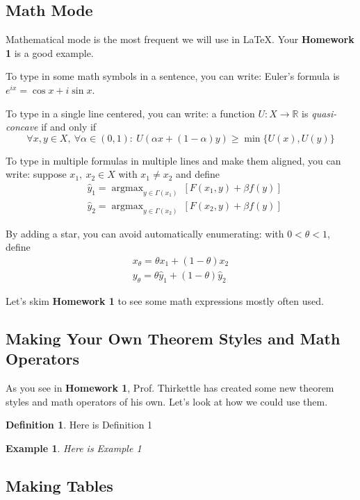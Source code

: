 \documentclass[10pt]{extarticle}
\theoremstyle{theorem}
\theoremstyle{lemma}
\theoremstyle{proposition}
\theoremstyle{corollary}
\theoremstyle{assumption}
\theoremstyle{model}
\theoremstyle{property}
\theoremstyle{example}
\newtheorem{ex}{Example}
\theoremstyle{algorithm}
\theoremstyle{definition}
\newtheorem{defn}{Definition}
\theoremstyle{axiom}
\theoremstyle{remark}
\begin{document}
\subsection{Math Mode}
Mathematical mode is the most frequent we will use in \LaTeX. Your \textbf{Homework 1} is a good example.

To type in some math symbols in a sentence, you can write: Euler's formula is $e^{ix}=\cos x+i \sin x$.

To type in a single line centered, you can write: a function $U:X\to \mathbb{R}$ is \textit{quasi-concave} if and only if
\[
\forall x,y \in X,~\forall \alpha \in (0,1):~U(\alpha x+(1-\alpha)y) \geq \min\{U(x),U(y)\}
\]

To type in multiple formulas in multiple lines and make them aligned, you can write: suppose $x_1,~x_2 \in X$ with $x_1 \neq x_2$ and define
\begin{align}
& \hat{y}_1=\mathop{\arg\max}_{y \in \Gamma(x_1)}~[F(x_1,y)+\beta f(y)] \\
& \hat{y}_2=\mathop{\arg\max}_{y \in \Gamma(x_2)}~[F(x_2,y)+\beta f(y)] 
\end{align}

By adding a star, you can avoid automatically enumerating: with $0<\theta<1$, define
\begin{align*}
x_\theta=\theta x_1+(1-\theta) x_2 \\
y_\theta=\theta \hat{y}_1+(1-\theta) \hat{y}_2
\end{align*}

Let's skim \textbf{Homework 1} to see some math expressions mostly often used. 

\subsection{Making Your Own Theorem Styles and Math Operators}
As you see in \textbf{Homework 1}, Prof. Thirkettle has created some new theorem styles and math operators of his own. Let's look at how we could use them.

\begin{defn}
Here is Definition 1
\end{defn}

\begin{ex}
Here is Example 1
\end{ex}

\subsection{Making Tables}
\end{document}
